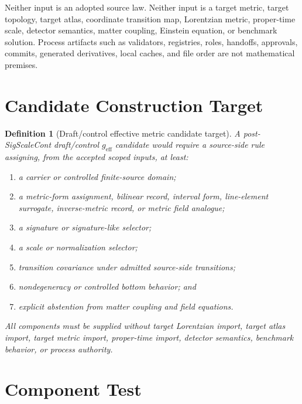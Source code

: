 \documentclass[11pt]{article}
\newcommand{\geff}{g_{\mathrm{eff}}}
\newtheorem{definition}{Definition}
\begin{document}
Neither input is an adopted source law. Neither input is a target metric,
target topology, target atlas, coordinate transition map, Lorentzian metric,
proper-time scale, detector semantics, matter coupling, Einstein equation, or
benchmark solution. Process artifacts such as validators, registries, roles,
handoffs, approvals, commits, generated derivatives, local caches, and file
order are not mathematical premises.

\section{Candidate Construction Target}

\begin{definition}[Draft/control effective metric candidate target]
A post-SigScaleCont draft/control \(\geff\) candidate would require a
source-side rule assigning, from the accepted scoped inputs, at least:
\begin{enumerate}[leftmargin=*]
  \item a carrier or controlled finite-source domain;
  \item a metric-form assignment, bilinear record, interval form, line-element
  surrogate, inverse-metric record, or metric field analogue;
  \item a signature or signature-like selector;
  \item a scale or normalization selector;
  \item transition covariance under admitted source-side transitions;
  \item nondegeneracy or controlled bottom behavior; and
  \item explicit abstention from matter coupling and field equations.
\end{enumerate}
All components must be supplied without target Lorentzian import, target atlas
import, target metric import, proper-time import, detector semantics,
benchmark behavior, or process authority.
\end{definition}

\section{Component Test}
\end{document}
